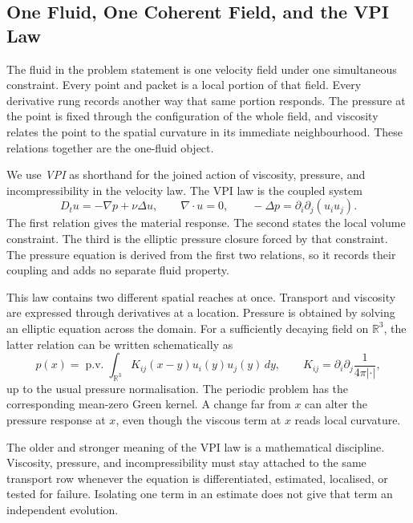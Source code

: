 \subsection{One Fluid, One Coherent Field, and the VPI Law}\label{sub:OneFluidOneCoherentFieldAndTheVPILaw}

The fluid in the problem statement is one velocity field under one simultaneous constraint.
Every point and packet is a local portion of that field.
Every derivative rung records another way that same portion responds.
The pressure at the point is fixed through the configuration of the whole field, and viscosity relates the point to the spatial curvature in its immediate neighbourhood.
These relations together are the one-fluid object.

We use \emph{VPI} as shorthand for the joined action of viscosity, pressure, and incompressibility in the velocity law.
The VPI law is the coupled system
\[
  D_tu=-\nabla p+\nu\Delta u,
  \qquad
  \nabla\cdot u=0,
  \qquad
  -\Delta p=\partial_i\partial_j(u_i u_j).
\]
The first relation gives the material response.
The second states the local volume constraint.
The third is the elliptic pressure closure forced by that constraint.
The pressure equation is derived from the first two relations, so it records their coupling and adds no separate fluid property.

This law contains two different spatial reaches at once.
Transport and viscosity are expressed through derivatives at a location.
Pressure is obtained by solving an elliptic equation across the domain.
For a sufficiently decaying field on \(\mathbb R^3\), the latter relation can be written schematically as
\[
  p(x)
  =
  \operatorname{p.v.}
  \int_{\mathbb R^3}
  K_{ij}(x-y)u_i(y)u_j(y)\,dy,
  \qquad
  K_{ij}
  =
  \partial_i\partial_j
  \frac{1}{4\pi|\cdot|},
\]
up to the usual pressure normalisation.
The periodic problem has the corresponding mean-zero Green kernel.
A change far from \(x\) can alter the pressure response at \(x\), even though the viscous term at \(x\) reads local curvature.


The older and stronger meaning of the VPI law is a mathematical discipline.
Viscosity, pressure, and incompressibility must stay attached to the same transport row whenever the equation is differentiated, estimated, localised, or tested for failure.
Isolating one term in an estimate does not give that term an independent evolution.

